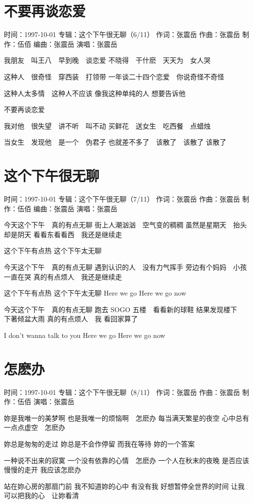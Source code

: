 \documentclass[UTF8,a4paper,oneside,twocolumn,12pt]{ctexbook}
\newcommand{\infopair}[2]{\textbullet #1：#2}
\newcommand{\zc}[1][伍佰]{\infopair{作词}{#1}}
\newcommand{\zq}[1][伍佰]{\infopair{作曲}{#1}}
\newcommand{\bq}[1][伍佰]{\infopair{编曲}{#1}}
\newcommand{\zj}[1]{\infopair{专辑}{#1}}
\newcommand{\zz}[1]{\infopair{制作}{#1}}
\newcommand{\sj}[1]{\infopair{时间}{#1}}
\newenvironment{info}{\begin{flushleft}\kaishu
	}
	{\end{flushleft}\normalsize\yahei\par}
\newenvironment{lyric}{
	}
{}
\begin{document}
\section{不要再谈恋爱}
\begin{info}
	\sj{1997-10-01}
	\zj{这个下午很无聊（6/11）}
	\zc[张震岳]
	\zq[张震岳]
	\zz{伍佰}
	\bq[张震岳]
	\infopair{演唱}{张震岳}
\end{info}
\begin{lyric}
	我朋友　叫王八　早到晚　谈恋爱
	不晓得　干什麽　天天为　女人哭

	这种人　很奇怪　穿西装　打领带
	一年谈二十四个恋爱　你说奇怪不奇怪

	这种人太多情　这种人不应该
	像我这种单纯的人 想要告诉他

	不要再谈恋爱

	我对他　很失望　讲不听　叫不动
	买鲜花　送女生　吃西餐　点蜡烛

	当女生　发现他　是一个　伪君子
	也就差不多了　该散了　该散了 该散了
\end{lyric}

\section{这个下午很无聊}
\begin{info}
	\sj{1997-10-01}
	\zj{这个下午很无聊（7/11）}
	\zc[张震岳]
	\zq[张震岳]
	\zz{伍佰}
	\bq[张震岳]
	\infopair{演唱}{张震岳}
\end{info}
\begin{lyric}
	今天这个下午　真的有点无聊
	街上人潮汹汹　空气变的稠稠
	虽然是星期天　抬头却是阴天
	看看东看看西　我还是继续走

	这个下午有点热 这个下午太无聊

	今天这个下午　真的有点无聊
	遇到认识的人　没有力气挥手
	旁边有个妈妈　小孩一直在哭
	真的有点烦人　我还是继续走

	这个下午有点热 这个下午太无聊
	Here we go Here we go now

	今天这个下午　真的有点无聊
	跑去 SOGO 五楼　看看新的球鞋
	结果发现楼下　下著倾盆大雨
	真的有点烦人　我 看回家算了

	I don't wanna talk to you
	Here we go Here we go now
\end{lyric}

\section{怎麽办}
\begin{info}
	\sj{1997-10-01}
	\zj{这个下午很无聊（8/11）}
	\zc[张震岳]
	\zq[张震岳]
	\zz{伍佰}
	\infopair{演唱}{张震岳}
\end{info}
\begin{lyric}
	妳是我唯一的美梦啊
	也是我唯一的烦恼啊　怎麽办
	每当满天繁星的夜空
	心中总有一点点虚空　怎麽办

	妳总是匆匆的走过
	妳总是不会作停留
	而我在等待
	妳的一个答案

	一种说不出来的寂寞
	一个没有依靠的心情　怎麽办
	一个人在秋末的夜晚
	是否应该慢慢的走开
	我应该怎麽办

	站在妳心房的那扇门前
	我不知道妳的心中 有没有我
	好想暂停全世界的时间
	让我可以把我的心　让妳看清
\end{lyric}
\end{document}
